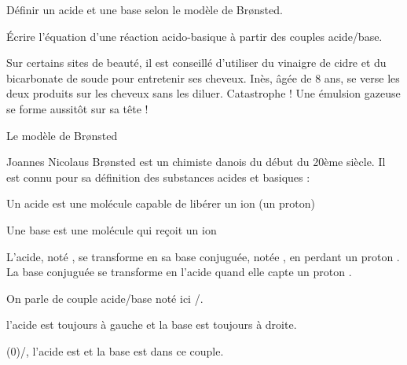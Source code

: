 \tetePremStssChim
{}

\begin{objectifs}
  \item Définir un acide et une base selon le modèle de Br\o{}nsted.
  \item Écrire l’équation d’une réaction acido-basique à partir des couples acide/base.
\end{objectifs}

\begin{contexte}
  Sur certains sites de beauté, il est conseillé d’utiliser du vinaigre de cidre et du bicarbonate de soude pour entretenir ses cheveux.
  Inès, âgée de 8 ans, se verse les deux produits sur les cheveux sans les diluer.
  Catastrophe ! Une émulsion gazeuse se forme aussitôt sur sa tête !

\end{contexte}

\begin{doc}{Le modèle de Br\o{}nsted}

  Joannes Nicolaus Br\o{}nsted est un chimiste danois du début du 20ème siècle.
  Il est connu pour sa définition des substances acides et basiques : 
  \begin{importants}    
    \begin{listePoints}
      \item Un acide est une molécule capable de libérer un ion \ionHydrogene (un proton)
      \item Une base est une molécule qui reçoit un ion \ionHydrogene
    \end{listePoints}
  \end{importants}
  
  L'acide, noté , se transforme en sa base conjuguée, notée , en perdant un proton \ionHydrogene.
  La base conjuguée  se transforme en l'acide  quand elle capte un proton \ionHydrogene.

  \begin{importants}
    On parle de couple acide/base noté ici /.    
  \end{importants}
  \attention l'acide est toujours à gauche et la base est toujours à droite.

  \exemple
  \texteTrou(0){/\chlorure, l'acide est  et la base \chlorure est dans ce couple.}
\end{doc}

